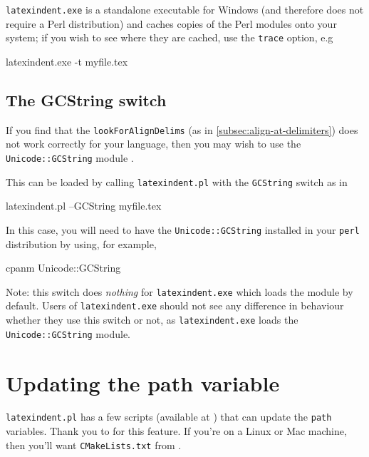   \texttt{latexindent.exe} is a standalone executable
  for Windows (and therefore does not require a Perl distribution) and caches copies of the
  Perl modules onto your system; if you wish to see where they are cached, use the
  \texttt{trace} option, e.g
  \begin{dosprompt}
latexindent.exe -t myfile.tex
 \end{dosprompt}

 \subsection{The GCString switch}\label{subsec:the-GCString}
  If you find that the \texttt{lookForAlignDelims} (as in \cref{subsec:align-at-delimiters}) does not work correctly
  for your language, then you may wish to use the \texttt{Unicode::GCString} module .

  This can be loaded by calling \texttt{latexindent.pl} with the \texttt{GCString} switch
  as in

  \begin{commandshell}
latexindent.pl --GCString myfile.tex
\end{commandshell}

  In this case, you will need to have the \texttt{Unicode::GCString} installed in your
  \texttt{perl} distribution by using, for example,

  \begin{commandshell}
cpanm Unicode::GCString
\end{commandshell}

  Note: this switch does \emph{nothing} for \texttt{latexindent.exe} which loads the
  module by default. Users of \texttt{latexindent.exe} should not see any difference in
  behaviour whether they use this switch or not, as \texttt{latexindent.exe} loads the
  \texttt{Unicode::GCString} module.

 \section{Updating the path variable}\label{sec:updating-path}
  \texttt{latexindent.pl} has a few scripts (available at \cite{latexindent-home}) that can
  update the \texttt{path} variables. Thank you to \cite{jasjuang} for this feature. If
  you're on a Linux or Mac machine, then you'll want \texttt{CMakeLists.txt} from
  \cite{latexindent-home}.
